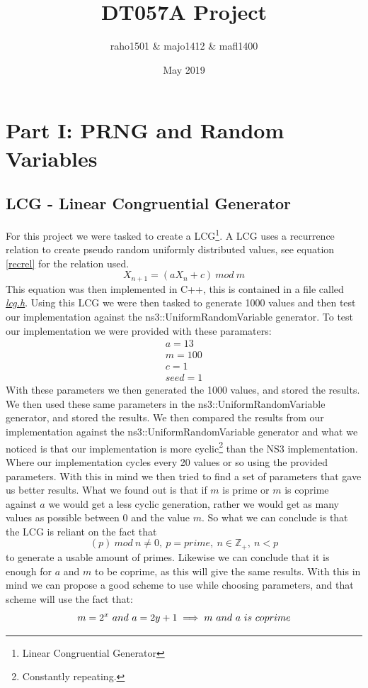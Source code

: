 \documentclass{article}
\title{DT057A Project}
\author{raho1501 \& majo1412 \& mafl1400}
\date{May 2019}
\begin{document}
\maketitle

\section{Part I: PRNG and Random Variables} \label{part1}
  \subsection{LCG - Linear Congruential Generator}
    For this project we were tasked to create a LCG\footnote{Linear Congruential Generator}. 
    A LCG uses a recurrence relation to create pseudo random uniformly distributed values, see equation \ref{recrel} for the relation used.
    \begin{equation} \label{recrel}
      X_{n+1} = (aX_{n} + c)\ mod\ m
    \end{equation}
    This equation was then implemented in C++, this is contained in a file called \href{https://github.com/NoRines/simulerings_projekt/blob/master/lcg.h}{\emph{lcg.h}}.
    Using this LCG we were then tasked to generate 1000 values and then test our implementation against the ns3::UniformRandomVariable generator. 
    To test our implementation we were provided with these paramaters:
    \begin{align*}
      a=13 \\
      m=100 \\
      c=1 \\
      seed=1
    \end{align*}
    With these parameters we then generated the 1000 values, and stored the results.
    We then used these same parameters in the ns3::UniformRandomVariable generator, and stored the results.
    We then compared the results from our implementation against the ns3::UniformRandomVariable generator and what we noticed is that our implementation is more cyclic\footnote{Constantly repeating.} than the NS3 implementation. 
    Where our implementation cycles every 20 values or so using the provided parameters.
    With this in mind we then tried to find a set of parameters that gave us better results.
    What we found out is that if $m$ is prime or $m$ is coprime against $a$ we would get a less cyclic generation, rather we would get as many values as possible between 0 and the value $m$.
    So what we can conclude is that the LCG is reliant on the fact that
    \begin{equation}
      (p)\ mod\ n \neq 0,\ p = prime,\ n \in \mathbb{Z}_{+} ,\ n < p
    \end{equation}
    to generate a usable amount of primes.
    Likewise we can conclude that it is enough for $a$ and $m$ to be coprime, as this will give the same results.
    With this in mind we can propose a good scheme to use while choosing parameters, and that scheme will use the fact that:
    \begin{equation}
      m = 2^{x}\ and\ a = 2y+1 \implies m\ and\ a\ is\ coprime \\
    \end{equation}
    
\end{document}
